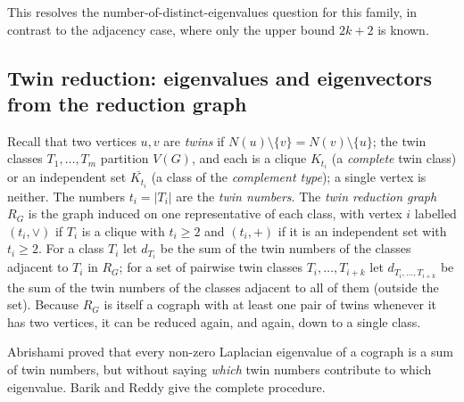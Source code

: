 \documentclass[11pt]{article}
\theoremstyle{plain}
\theoremstyle{definition}
\theoremstyle{remark}
\begin{document}
	This resolves the number-of-distinct-eigenvalues question for this family, in contrast to the adjacency case, where only the upper bound $2k+2$ is known.
	
	\subsection{Twin reduction: eigenvalues and eigenvectors from the reduction graph}
	\label{sub:twinred}
	
	Recall that two vertices $u,v$ are \emph{twins} if $N(u)\setminus\{v\}=N(v)\setminus\{u\}$; the twin classes $T_1,\dots,T_m$ partition $V(G)$, and each is a clique $K_{t_i}$ (a \emph{complete} twin class) or an independent set $\overline{K_{t_i}}$ (a class of the \emph{complement type}); a single vertex is neither. The numbers $t_i=|T_i|$ are the \emph{twin numbers}. The \emph{twin reduction graph} $R_G$ is the graph induced on one representative of each class, with vertex $i$ labelled $(t_i,\vee)$ if $T_i$ is a clique with $t_i\ge2$ and $(t_i,+)$ if it is an independent set with $t_i\ge2$. For a class $T_i$ let $d_{T_i}$ be the sum of the twin numbers of the classes adjacent to $T_i$ in $R_G$; for a set of pairwise twin classes $T_i,\dots,T_{i+k}$ let $d_{T_i,\dots,T_{i+k}}$ be the sum of the twin numbers of the classes adjacent to all of them (outside the set). Because $R_G$ is itself a cograph with at least one pair of twins whenever it has two vertices, it can be reduced again, and again, down to a single class.
	
	Abrishami \cite{Abrishami2019} proved that every non-zero Laplacian eigenvalue of a cograph is a sum of twin numbers, but without saying \emph{which} twin numbers contribute to which eigenvalue. Barik and Reddy \cite{BarikReddy2023} give the complete procedure.
	
\end{document}
